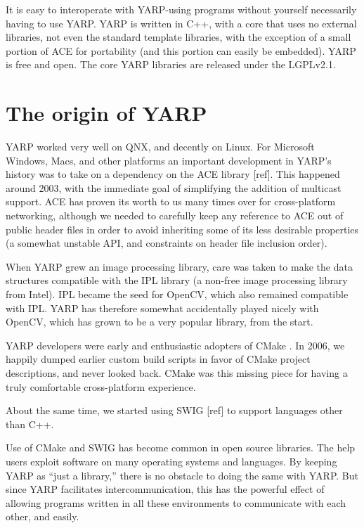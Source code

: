 \documentclass[letterpaper]{article}
\begin{document}
It is easy to interoperate with YARP-using programs
without yourself necessarily having to use YARP. 
YARP is written in C++, with a core that uses
no external libraries, not even the standard template libraries, with
the exception of a small portion of ACE for portability (and this
portion can easily be embedded). YARP is free and open.  The
core YARP libraries are released under the LGPLv2.1.

\section{The origin of YARP}


YARP worked very well on QNX, and decently on Linux.  For Microsoft
Windows, Macs, and other platforms an important development in YARP's
history was to take on a dependency on the ACE library [ref].  This
happened around 2003, with the immediate goal of simplifying the
addition of multicast support.  ACE has proven its worth to us many
times over for cross-platform networking, although we needed
to carefully keep any reference to ACE out of public header files
in order to avoid inheriting some of its less desirable properties
(a somewhat unstable API, and constraints on header file inclusion
order).

When YARP grew an image processing library, care was taken to make the
data structures compatible with the IPL library (a non-free image
processing library from Intel).  IPL became the seed for OpenCV, which
also remained compatible with IPL. YARP has therefore somewhat
accidentally played nicely with OpenCV, which has grown to be a very
popular library, from the start.

YARP developers were early and enthusiastic adopters of CMake
\cite{fitzpatrick10cmaking}.  In 2006, we happily dumped
earlier custom build scripts in favor of CMake project descriptions,
and never looked back.  CMake was this missing piece for having a
truly comfortable cross-platform experience.

About the same time, we started using SWIG [ref] to support languages
other than C++.

Use of CMake and SWIG has become common in open source libraries.
The help users exploit software on many operating systems and 
languages.  By keeping YARP as ``just a library,'' there is no
obstacle to doing the same with YARP.  But since YARP facilitates
intercommunication, this has the powerful effect of allowing 
programs written in all these environments to communicate with
each other, and easily.




\end{document}
